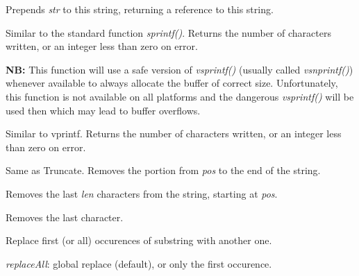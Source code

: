 {\label{wxstringprepend}


Prepends {\it str} to this string, returning a reference to this string.

\label{wxstringprintf}


Similar to the standard function {\it sprintf()}. Returns the number of
characters written, or an integer less than zero on error.

{\bf NB:} This function will use a safe version of {\it vsprintf()} (usually called 
{\it vsnprintf()}) whenever available to always allocate the buffer of correct
size. Unfortunately, this function is not available on all platforms and the
dangerous {\it vsprintf()} will be used then which may lead to buffer overflows.

\label{wxstringprintfv}


Similar to vprintf. Returns the number of characters written, or an integer less than zero
on error.

\label{wxstringremove}


Same as Truncate. Removes the portion from {\it pos} to the end of the string.


Removes the last {\it len} characters from the string, starting at {\it pos}.

\label{wxstringremovelast}


Removes the last character.

\label{wxstringreplace}


Replace first (or all) occurences of substring with another one.

{\it replaceAll}: global replace (default), or only the first occurence.

}

